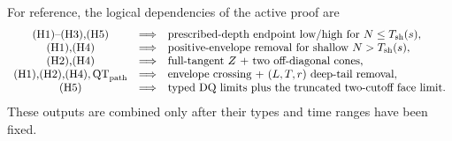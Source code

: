 \documentclass[11pt]{article}
\begin{document}
For reference, the logical dependencies of the active proof are
\begingroup\small
\[
\begin{array}{ccl}
 \textup{(H1)--(H3),(H5)}&\Longrightarrow&
   \text{prescribed-depth endpoint low/high for }N\le T_{\rm sh}(s),\\
 \textup{(H1),(H4)}&\Longrightarrow&
   \text{positive-envelope removal for shallow }N>T_{\rm sh}(s),\\
 \textup{(H2),(H4)}&\Longrightarrow&
   \text{full-tangent }Z\text{ + two off-diagonal cones},\\
 \textup{(H1),(H2),(H4)},\mathrm{QT}_{\rm path}&\Longrightarrow&
   \text{envelope crossing + }(L,T,r)\text{ deep-tail removal},\\
 \textup{(H5)}&\Longrightarrow&
   \text{typed DQ limits plus the truncated two-cutoff face limit}.
\end{array}
\]
\endgroup
These outputs are combined only after their types and time ranges have been
fixed.
\end{document}
